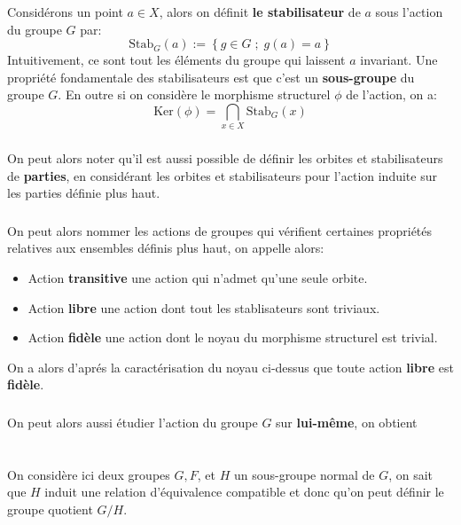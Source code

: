 \subsection*{}
Considérons un point \( a \in X \), alors on définit \textbf{le stabilisateur} de \( a \) sous l'action du groupe \( G \) par:
\[ 
   \text{Stab}_G(a) := \left\{ g \in G \; ; \; g(a) = a\right\} 
\]
Intuitivement, ce sont tout les éléments du groupe qui laissent \( a \) invariant. Une propriété fondamentale des stabilisateurs est que c'est un \textbf{sous-groupe} du groupe \( G \). En outre si on considère le morphisme structurel \( \phi \) de l'action, on a:
\[ 
   \text{Ker}( \phi) = \bigcap_{x \in X} \text{Stab}_G(x) 
\]
\subsection*{}
On peut alors noter qu'il est aussi possible de définir les orbites et stabilisateurs de \textbf{parties}, en considérant les orbites et stabilisateurs pour l'action induite sur les parties définie plus haut.
\subsection*{}
On peut alors nommer les actions de groupes qui vérifient certaines propriétés relatives aux ensembles définis plus haut, on appelle alors:
\begin{itemize}
   \item Action \textbf{transitive} une action qui n'admet qu'une seule orbite.
   \item Action \textbf{libre} une action dont tout les stablisateurs sont triviaux.
   \item Action \textbf{fidèle} une action dont le noyau du morphisme structurel est trivial.
\end{itemize}
On a alors d'aprés la caractérisation du noyau ci-dessus que toute action \textbf{libre} est \textbf{fidèle}.
\subsection*{}
On peut alors aussi étudier l'action du groupe \( G \) sur \textbf{lui-même}, on obtient 


\chapter*{}
On considère ici deux groupes \(G, F\), et \(H\) un sous-groupe normal de \(G\), on sait que \(H\) induit une relation d'équivalence compatible et donc qu'on peut définir le groupe quotient \(G/H\).\<
